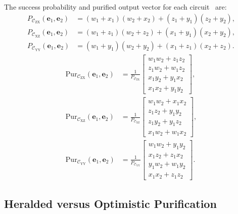 The success probability and purified output vector for each
circuit~\cite{Benchasattabuse2025Integrating} are:
\begin{align}
    P_{\mathcal C_\mathrm{ZX}}(\mathbf{e}_1,\mathbf{e}_2)
        &= (w_1+x_1)(w_2+x_2)+(z_1+y_1)(z_2+y_2), \label{eq:pzx}\\
    P_{\mathcal C_\mathrm{XZ}}(\mathbf{e}_1,\mathbf{e}_2)
        &= (w_1+z_1)(w_2+z_2)+(x_1+y_1)(x_2+y_2), \label{eq:pxz}\\
    P_{\mathcal C_\mathrm{YY}}(\mathbf{e}_1,\mathbf{e}_2)
        &= (w_1+y_1)(w_2+y_2)+(x_1+z_1)(x_2+z_2). \label{eq:pyy}
\end{align}
\begin{align}
    \mathrm{Pur}_{\mathcal C_\mathrm{ZX}}(\mathbf{e}_1,\mathbf{e}_2) &=
        \frac{1}{P_{\mathcal C_\mathrm{ZX}}}
        \begin{bmatrix}
            w_1 w_2 + z_1 z_2 \\
            z_1 w_2 + w_1 z_2 \\
            x_1 y_2 + y_1 x_2 \\
            x_1 x_2 + y_1 y_2
        \end{bmatrix},
    \label{eq:purzx}\\
    \mathrm{Pur}_{\mathcal C_\mathrm{XZ}}(\mathbf{e}_1,\mathbf{e}_2) &=
        \frac{1}{P_{\mathcal C_\mathrm{XZ}}}
        \begin{bmatrix}
            w_1 w_2 + x_1 x_2 \\
            z_1 z_2 + y_1 y_2 \\
            z_1 y_2 + y_1 z_2 \\
            x_1 w_2 + w_1 x_2
        \end{bmatrix},
    \label{eq:purxz}\\
    \mathrm{Pur}_{\mathcal C_\mathrm{YY}}(\mathbf{e}_1,\mathbf{e}_2) &=
        \frac{1}{P_{\mathcal C_\mathrm{YY}}}
        \begin{bmatrix}
            w_1 w_2 + y_1 y_2 \\
            x_1 z_2 + z_1 x_2 \\
            y_1 w_2 + w_1 y_2 \\
            x_1 x_2 + z_1 z_2
        \end{bmatrix}.
    \label{eq:puryy}
\end{align}


\subsection{Heralded versus Optimistic Purification}
\label{sec:bg:optimistic}


